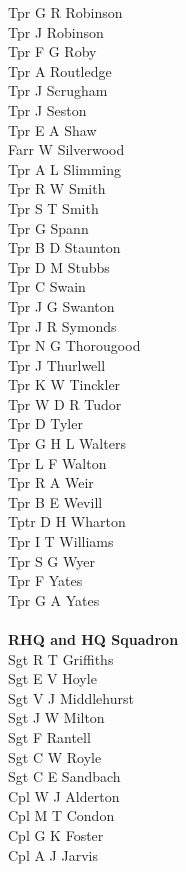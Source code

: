 \begin{multicols}{2}
  Tpr G R Robinson \\
  Tpr J Robinson \\
  Tpr F G Roby \\
  Tpr A Routledge \\
  Tpr J Scrugham \\
  Tpr J Seston \\
  Tpr E A Shaw \\
  Farr W Silverwood \\
  Tpr A L Slimming \\
  Tpr R W Smith \\
  Tpr S T Smith \\
  Tpr G Spann \\
  Tpr B D Staunton \\
  Tpr D M Stubbs \\
  Tpr C Swain \\
  Tpr J G Swanton \\
  Tpr J R Symonds \\
  Tpr N G Thorougood \\
  Tpr J Thurlwell \\
  Tpr K W Tinckler \\
  Tpr W D R Tudor \\
  Tpr D Tyler \\
  Tpr G H L Walters \\
  Tpr L F Walton \\
  Tpr R A Weir \\
  Tpr B E Wevill \\
  Tptr D H Wharton \\
  Tpr I T Williams \\
  Tpr S G Wyer \\
  Tpr F Yates \\
  Tpr G A Yates \\
  \\
  \textbf{RHQ and HQ Squadron} \\
  Sgt R T Griffiths \\
  Sgt E V Hoyle \\
  Sgt V J Middlehurst \\
  Sgt J W Milton \\
  Sgt F Rantell \\
  Sgt C W Royle \\
  Sgt C E Sandbach \\
  Cpl W J Alderton \\
  Cpl M T Condon \\
  Cpl G K Foster \\
  Cpl A J Jarvis \\

\end{multicols}
